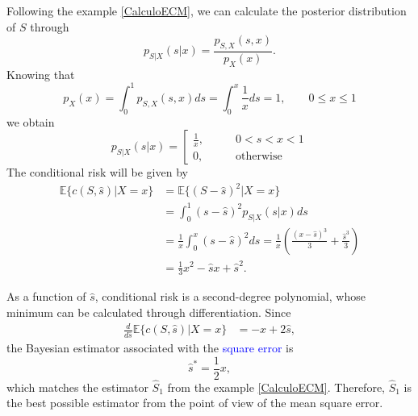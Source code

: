 \begin{example}
\label{CalculoECM2}
Following the example \ref{CalculoECM}, we can calculate the posterior distribution of $S$ through
\begin{equation}
p_{S|X}(s|x) = \frac{p_{S,X}(s,x)}{p_X(x)}. 
\end{equation}
Knowing that
\begin{equation}
p_{X}(x) = \int_0^1 p_{S,X}(s,x) ds = \int_0^x \frac{1}{x} ds = 1,   \qquad 0\le x\le 1
\end{equation}
we obtain
\begin{equation}
p_{S|X}(s|x) = \left[
\begin{array}{ll}
\frac{1}{x}, & \qquad 0<s<x<1 \\
0,           & \qquad \text{otherwise}
\end{array}
\right.
\end{equation}
The conditional risk will be given by
\begin{align}
\mathbb{E}\{c(S,\hat s)|X=x\} 
   &= \mathbb{E}\{(S-\hat s)^2|X=x\} \nonumber\\
   &= \int_0^1 (s-\hat{s})^2 p_{S|X}(s|x) ds   \nonumber\\
   &= \frac{1}{x} \int_0^x (s-\hat{s})^2 ds  
    = \frac{1}{x} \left(\frac{(x-\hat{s})^3}{3} + \frac{\hat{s}^3}{3} \right)    \nonumber\\
   &= \frac{1}{3}x^2 - \hat{s} x + \hat{s}^2. 
\label{Est:ECMsx}
\end{align}

As a function of $\hat{s}$, conditional risk is a second-degree polynomial, whose minimum can be calculated through differentiation. Since
\begin{align}
\frac{d}{d\hat{s}} \mathbb{E}\{c(S,\hat s)|X=x\} 
   &= - x + 2 \hat{s} ,
\end{align}
the Bayesian estimator associated with the \textcolor{blue}{square error} is
\begin{equation}
\label{eq:sopt_halfx}
\hat{s}^* = \frac{1}{2}x,
\end{equation}
which matches the estimator $\hat{S}_1$ from the example \ref{CalculoECM}. Therefore, $\hat{S}_1$ is the best possible estimator from the point of view of the mean square error.
\end{example}\vspace{0.4cm}


